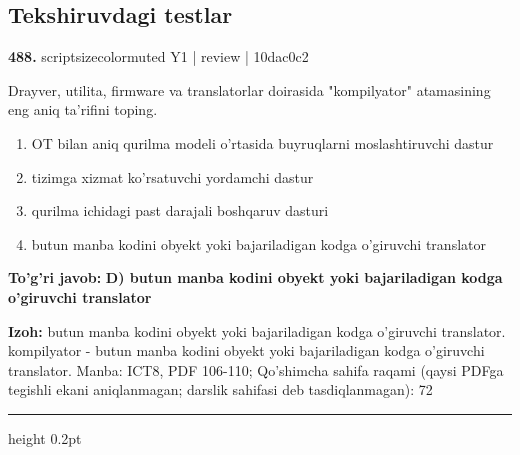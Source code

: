 \documentclass[10pt,a4paper]{article}
\begin{document}
\subsection{Tekshiruvdagi testlar}

{\bfseries\sffamily\color{ink} 488.} {scriptsizecolor{muted} Y1 | review | 10dac0c2}
\par
Drayver, utilita, firmware va translatorlar doirasida "kompilyator" atamasining eng aniq ta'rifini toping.
\begin{enumerate}[label=\Alph*),leftmargin=9mm]
\item OT bilan aniq qurilma modeli o'rtasida buyruqlarni moslashtiruvchi dastur
\item tizimga xizmat ko'rsatuvchi yordamchi dastur
\item qurilma ichidagi past darajali boshqaruv dasturi
\item butun manba kodini obyekt yoki bajariladigan kodga o'giruvchi translator
\end{enumerate}
\begin{tcolorbox}[enhanced,breakable,colback=teal!4,colframe=teal!60!black,boxrule=0.45pt,arc=1.2mm,left=2.7mm,right=2.7mm,top=1.8mm,bottom=1.8mm,before skip=2mm,after skip=2mm]
{\bfseries\sffamily\color{teal}To'g'ri javob:} \textbf{D) butun manba kodini obyekt yoki bajariladigan kodga o'giruvchi translator}
\par\smallskip
{\bfseries Izoh:} butun manba kodini obyekt yoki bajariladigan kodga o'giruvchi translator. kompilyator - butun manba kodini obyekt yoki bajariladigan kodga o'giruvchi translator. Manba: ICT8, PDF 106-110; Qo'shimcha sahifa raqami (qaysi PDFga tegishli ekani aniqlanmagan; darslik sahifasi deb tasdiqlanmagan): 72
\end{tcolorbox}
\vspace{2mm}\hrule height 0.2pt\vspace{3mm}
\end{document}
